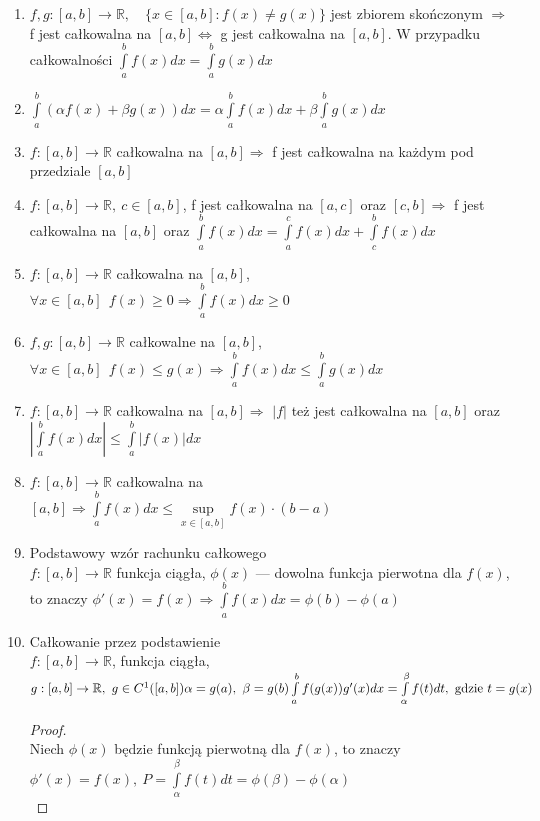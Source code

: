 \documentclass[12pt,a4paper]{article}
\theoremstyle{definition}
\begin{document}
\begin{enumerate}
\item $f,g: [a,b] \to \mathbb{R}, \quad\{x\in[a,b]: f(x) \neq g(x)\}$ jest zbiorem skończonym $\Rightarrow$ f jest całkowalna na $[a,b]\Leftrightarrow$ g jest całkowalna na $[a,b]$. W przypadku całkowalności $\int\limits_a^bf(x)dx=\int\limits_a^bg(x)dx$
\item $ \int\limits_{a}^{b} (\alpha f(x) + \beta g(x))dx = \alpha \int\limits_a^b f(x)dx + \beta \int\limits_a^bg(x)dx $
\item $f: [a,b]\to\mathbb{R}$ całkowalna na $[a,b] \Rightarrow$ f jest całkowalna na każdym pod przedziale $[a,b]$
\item $f: [a,b]\to\mathbb{R}, ~ c\in [a,b]$, f jest całkowalna na $[a,c]$ oraz $[c,b] \Rightarrow$ f jest całkowalna na $[a,b]$ oraz $\int\limits_a^bf(x)dx = \int\limits_a^cf(x)dx + \int\limits_c^bf(x)dx$
\item $f: [a,b] \to \mathbb{R}$ całkowalna na $[a,b]$, $\forall x\in[a,b] ~~ f(x) \geq 0 \Rightarrow \int\limits_a^bf(x)dx \geq 0$
\item $f,g: [a,b] \to \mathbb{R}$ całkowalne na $[a,b]$, $\forall x\in[a,b] ~~ f(x) \leqslant g(x) \Rightarrow \int\limits_a^bf(x)dx \leqslant \int\limits_a^bg(x)dx$
\item $f: [a,b] \to \mathbb{R}$ całkowalna na $[a,b] \Rightarrow$ $|f|$ też jest całkowalna na $[a,b]$ oraz $|\int\limits_a^bf(x)dx| \leqslant \int\limits_a^b|f(x)|dx$
\item $f: [a,b] \to \mathbb{R}$ całkowalna na $[a,b] \Rightarrow \int\limits_a^bf(x)dx \leqslant \sup\limits_{x\in[a,b]}f(x)\cdot(b-a)$
\item Podstawowy wzór rachunku całkowego\\
$f: [a,b] \to \mathbb{R}$ funkcja ciągła, $\phi(x)$ --- dowolna funkcja pierwotna dla $f(x)$, to znaczy $\phi'(x)=f(x) \Rightarrow \int\limits_a^bf(x)dx = \phi(b)-\phi(a)$
\item Całkowanie przez podstawienie\\
$
f: [a,b]\to\mathbb{R}$, funkcja ciągła, $g: [a,b]\to\mathbb{R},~ g\in C^1([a,b])\\
\alpha = g(a),~ \beta =g(b)\\
\int\limits_a^bf(g(x))g'(x)dx = \int\limits_\alpha^\beta f(t)dt, \text{ gdzie }t = g(x)
$
\begin{proof}~\\
	Niech $\phi(x)$ będzie funkcją pierwotną dla $f(x)$, to znaczy
	 $\phi'(x) = f(x), ~ P=\int\limits_\alpha^\beta f(t)dt = \phi(\beta)-\phi(\alpha)$\\

\end{proof}
\end{enumerate}
\end{document}
